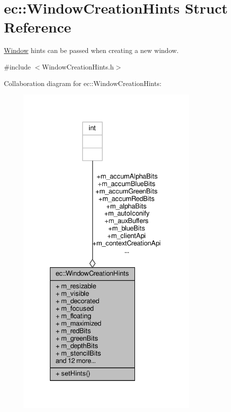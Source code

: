\hypertarget{structec_1_1_window_creation_hints}{}\section{ec\+:\+:Window\+Creation\+Hints Struct Reference}
\label{structec_1_1_window_creation_hints}


\mbox{\hyperlink{classec_1_1_window}{Window}} hints can be passed when creating a new window.  




{\ttfamily \#include $<$Window\+Creation\+Hints.\+h$>$}



Collaboration diagram for ec\+:\+:Window\+Creation\+Hints\+:\nopagebreak
\begin{figure}[H]
\begin{center}
\leavevmode
\includegraphics[width=256pt]{structec_1_1_window_creation_hints__coll__graph}
\end{center}
\end{figure}

